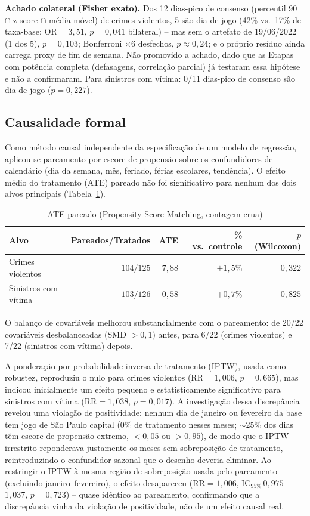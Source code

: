 \documentclass[12pt]{article}
\begin{document}
\textbf{Achado colateral (Fisher exato).} Dos 12 dias-pico de consenso
(percentil 90 $\cap$ z-score $\cap$ média móvel) de crimes violentos, 5
são dia de jogo (42\% vs.\ 17\% de taxa-base; OR$=3,51$, $p=0,041$
bilateral) -- mas sem o artefato de 19/06/2022 (1 dos 5), $p=0,103$;
Bonferroni $\times6$ desfechos, $p\approx0,24$; e o próprio resíduo ainda
carrega proxy de fim de semana. Não promovido a achado, dado que as
Etapas com potência completa (defasagens, correlação parcial) já
testaram essa hipótese e não a confirmaram. Para sinistros com vítima:
0/11 dias-pico de consenso são dia de jogo ($p=0,227$).

\subsection{Causalidade formal}

Como método causal independente da especificação de um modelo de
regressão, aplicou-se pareamento por escore de propensão sobre os
confundidores de calendário (dia da semana, mês, feriado, férias
escolares, tendência). O efeito médio do tratamento (ATE) pareado não foi
significativo para nenhum dos dois alvos principais
(Tabela~\ref{tab:psm}).

\begin{table}[ht]
\centering
\caption{ATE pareado (Propensity Score Matching, contagem crua)}
\label{tab:psm}
\small
\begin{tabular}{@{}lrrrr@{}}
\toprule
\textbf{Alvo} & \textbf{Pareados/Tratados} & \textbf{ATE} & \textbf{\% vs.\ controle} & \textbf{$p$ (Wilcoxon)} \\
\midrule
Crimes violentos     & $104/125$ & $7,88$ & $+1,5\%$ & $0,322$ \\
Sinistros com vítima & $103/126$ & $0,58$ & $+0,7\%$ & $0,825$ \\
\bottomrule
\end{tabular}
\end{table}

O balanço de covariáveis melhorou substancialmente com o pareamento: de
20/22 covariáveis desbalanceadas (SMD $>0,1$) antes, para 6/22 (crimes
violentos) e 7/22 (sinistros com vítima) depois.

A ponderação por probabilidade inversa de tratamento (IPTW), usada como
robustez, reproduziu o nulo para crimes violentos
($\text{RR}=1,006$, $p=0,665$), mas indicou inicialmente um efeito
pequeno e estatisticamente significativo para sinistros com vítima
($\text{RR}=1,038$, $p=0,017$). A investigação dessa discrepância revelou
uma violação de positividade: nenhum dia de janeiro ou fevereiro da base
tem jogo de São Paulo capital (0\% de tratamento nesses meses;
$\sim$25\% dos dias têm escore de propensão extremo, $<0,05$ ou
$>0,95$), de modo que o IPTW irrestrito reponderava justamente os meses
sem sobreposição de tratamento, reintroduzindo o confundidor sazonal que
o desenho deveria eliminar. Ao restringir o IPTW à mesma região de
sobreposição usada pelo pareamento (excluindo janeiro--fevereiro), o
efeito desapareceu ($\text{RR}=1,006$, $\text{IC}_{95\%}\,
0,975$--$1,037$, $p=0,723$) -- quase idêntico ao pareamento, confirmando
que a discrepância vinha da violação de positividade, não de um efeito
causal real.
\end{document}

